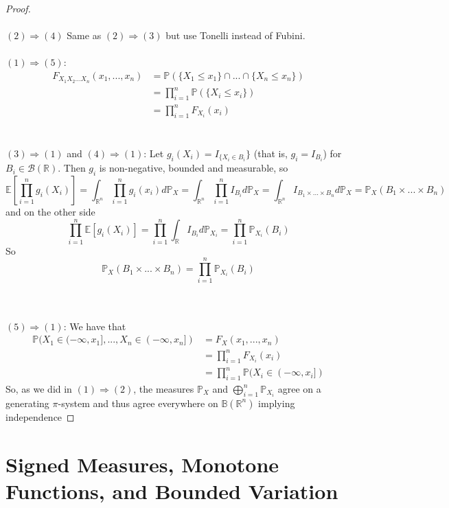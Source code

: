 \documentclass[11pt,a4paper]{article}
\theoremstyle{definition}
\begin{document}
\begin{proof}
    ~\\~\\
    $(2) \Longrightarrow (4)$ Same as $(2) \Longrightarrow (3)$ but use Tonelli instead of Fubini. ~\\ ~\\ $(1) \Longrightarrow (5)$: 
    \begin{align*}
        F_{X_1X_2...X_n} (x_1, ..., x_n) & = \mathbb{P}(\{X_1 \le x_1\} \cap ... \cap \{X_n \le x_n\}) \\ & = \prod_{i=1}^n  \mathbb{P} (\{X_i \le x_i\}) \\ & = \prod _{i=1}^n F_{X_i}(x_i) 
    \end{align*} ~\\ ~\\
\noindent
    $(3) \Longrightarrow (1)$ and $(4) \Longrightarrow (1)$: Let $g_i (X_i) = I_{\{X_i \in B_i}\}$ (that is, $g_i = I_{B_i}$) for $B_i \in \mathcal{B}(\mathbb{R})$. Then $g_i$ is non-negative, bounded and measurable, so \[
    \mathbb{E} \left [ \prod _{i=1}^n g_i(X_i)  \right ]= \int _{\mathbb{R}^n}\prod_{i=1}^n g_i(x_i) d\mathbb{P}_X = \int _{\mathbb{R}^n}\prod _{i=1}^n I_{B_i} d\mathbb{P}_X = \int _{\mathbb{R}^n} I_{B_1 \times ... \times B_n} d\mathbb{P}_X = \mathbb{P}_X(B_1 \times ... \times B_n)
    \] and on the other side \[
    \prod _{i=1}^n \mathbb{E}[g_i(X_i)] = \prod _{i=1}^n \int _{\mathbb{R}}I_{B_i} d\mathbb{P}_{X_i} = \prod _{i=1}^n\mathbb{P}_{X_i}(B_i)
    \]
    So \[
    \mathbb{P}_X(B_1 \times ... \times B_n)= \prod _{i=1}^n\mathbb{P}_{X_i}(B_i)
    \]

    ~\\~\\ $(5) \Longrightarrow (1)$: We have that
    \begin{align*}
        \mathbb{P} (X_1 \in (-\infty, x_1], ..., X_n \in (-\infty, x_n]) & = F_{X}(x_1, ..., x_n) \\ & = \prod \limits _{i=1}^n F_{X_i} (x_i) \\ & = \prod \limits _{i=1}^n \mathbb{P} (X_i \in (-\infty, x_i])
    \end{align*}
    So, as we did in $(1) \Rightarrow (2)$, the measures $\mathbb{P}_X$ and $\bigoplus \limits _{i=1}^n \mathbb{P}_{X_i}$ agree on a generating $\pi$-system and thus agree everywhere on $\mathbb{B}(\mathbb{R}^n)$ implying independence
\end{proof}

\newpage 
\section{Signed Measures, Monotone Functions, and Bounded Variation}
\end{document}
